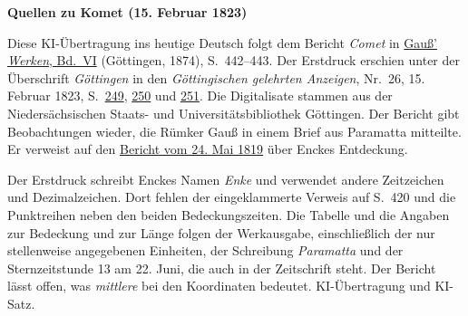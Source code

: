 \clearpage\thispagestyle{empty}
\begin{center}\textbf{Quellen zu Komet (15. Februar 1823)}\end{center}
\noindent Diese KI-Übertragung ins heutige Deutsch folgt dem Bericht \textit{Comet} in \href{https://gdz.sub.uni-goettingen.de/id/PPN236007467}{Gauß’ \textit{Werken}, Bd.~VI} (Göttingen, 1874), S.~442--443. Der Erstdruck erschien unter der Überschrift \textit{Göttingen} in den \textit{Göttingischen gelehrten Anzeigen}, Nr.~26, 15. Februar 1823, S.~\href{https://images.p.sub.uni-goettingen.de/iiif/image/gdz:PPN385030444_1823_1:00000251/full/1600,/0/default.jpg}{249}, \href{https://images.p.sub.uni-goettingen.de/iiif/image/gdz:PPN385030444_1823_1:00000252/full/1600,/0/default.jpg}{250} und \href{https://images.p.sub.uni-goettingen.de/iiif/image/gdz:PPN385030444_1823_1:00000253/full/1600,/0/default.jpg}{251}. Die Digitalisate stammen aus der Niedersächsischen Staats- und Universitätsbibliothek Göttingen. Der Bericht gibt Beobachtungen wieder, die Rümker Gauß in einem Brief aus Paramatta mitteilte. Er verweist auf den \hyperlink{native-425}{Bericht vom 24. Mai 1819} über Enckes Entdeckung.
\par\smallskip\noindent Der Erstdruck schreibt Enckes Namen \textit{Enke} und verwendet andere Zeitzeichen und Dezimalzeichen. Dort fehlen der eingeklammerte Verweis auf S.~420 und die Punktreihen neben den beiden Bedeckungszeiten. Die Tabelle und die Angaben zur Bedeckung und zur Länge folgen der Werkausgabe, einschließlich der nur stellenweise angegebenen Einheiten, der Schreibung \textit{Paramatta} und der Sternzeitstunde 13 am 22. Juni, die auch in der Zeitschrift steht. Der Bericht lässt offen, was \textit{mittlere} bei den Koordinaten bedeutet. KI-Übertragung und KI-Satz.
\clearpage
